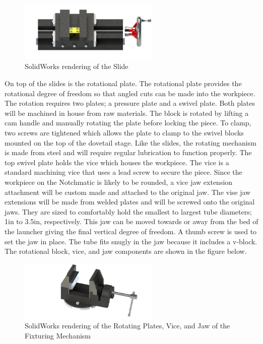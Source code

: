 \begin{figure}[H]
    \centering
    \includegraphics[width=0.6\textwidth]{./images/Chapter2-MachineDescription/Slide2}
    \caption{SolidWorks rendering of the Slide}
    \label{fig:Electrical:Slide}
\end{figure}

On top of the slides is the rotational plate. The rotational plate provides the rotational degree of freedom so that angled cuts can be made into the workpiece. The rotation requires two plates; a pressure plate and a swivel plate. Both plates will be machined in house from raw materials. The block is rotated by lifting a cam handle and manually rotating the plate before locking the piece. To clamp, two screws are tightened which allows the plate to clamp to the swivel blocks mounted on the top of the dovetail stage. Like the slides, the rotating mechanism is made from steel and will require regular lubrication to function properly. The top swivel plate holds the vice which houses the workpiece. The vice is a standard machining vice that uses a lead screw to secure the piece. Since the workpiece on the Notchmatic is likely to be rounded, a vice jaw extension attachment will be custom made and attached to the original jaw. The vise jaw extensions will be made from welded plates and will be screwed onto the original jaws. They are sized to comfortably hold the smallest to largest tube diameters; 1in to 3.5in, respectively. This jaw can be moved towards or away from the bed of the launcher giving the final vertical degree of freedom. A thumb screw is used to set the jaw in place. The tube fits snugly in the jaw because it includes a v-block. The rotational block, vice, and jaw components are shown in the figure below. 

\begin{figure}[H]
    \centering
    \includegraphics[width=0.6\textwidth]{./images/Chapter2-MachineDescription/Vice}
    \caption{SolidWorks rendering of the Rotating Plates, Vice, and Jaw of the Fixturing Mechanism}
    \label{fig:Electrical:Vice}
\end{figure}


